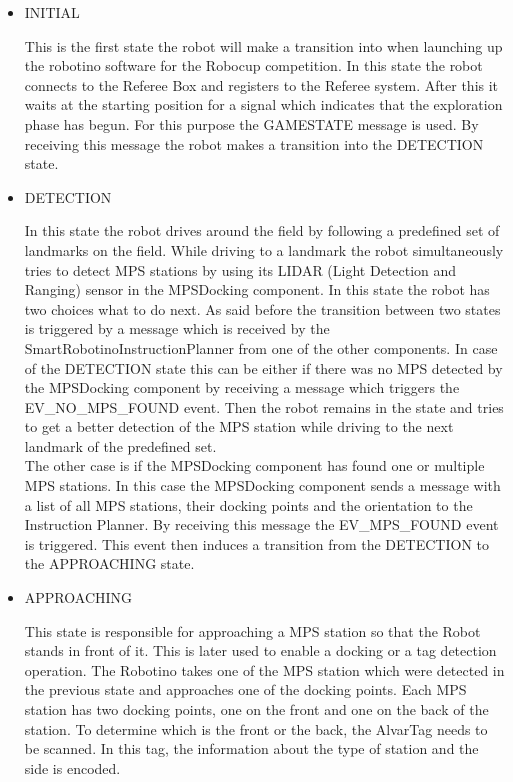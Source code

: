\begin{itemize}

\item INITIAL 

This is the first state the robot will make a transition into when launching up the robotino software for the Robocup competition. In this state the robot connects to the Referee Box and registers to the Referee system. After this it waits at the starting position for a signal which indicates that the exploration phase has begun. For this purpose the GAMESTATE message is used. By receiving this message the robot makes a transition into the DETECTION state.   


\item DETECTION

In this state the robot drives around the field by following a predefined set of landmarks on the field. While driving to a landmark the robot simultaneously tries to detect MPS stations by using its LIDAR (Light Detection and Ranging) sensor in the MPSDocking component. In this state the robot has two choices what to do next. As said before the transition between two states is triggered by a message which is received by the SmartRobotinoInstructionPlanner from one of the other components. In case of the DETECTION state this can be either if there was no MPS detected by the MPSDocking component by receiving a message which triggers the EV\_NO\_MPS\_FOUND event. Then the robot remains in the state and tries to get a better detection of the MPS station while driving to the next landmark of the predefined set.  \\

The other case is if the MPSDocking component has found one or multiple MPS stations. In this case the MPSDocking component sends a message with a list of all MPS stations, their docking points and the orientation to the Instruction Planner. By receiving this message the EV\_MPS\_FOUND event is triggered. This event then induces a transition from the DETECTION to the APPROACHING state. 

\item APPROACHING 

This state is responsible for approaching a MPS station so that the Robot stands in front of it. This is later used to enable a docking or a tag detection operation. The Robotino takes one of the MPS station which were detected in the previous state and approaches one of the docking points. Each MPS station has two docking points, one on the front and one on the back of the station. To determine which is the front or the back, the AlvarTag needs to be scanned. In this tag, the information about the type of station and the side is encoded. \\


\end{itemize}

